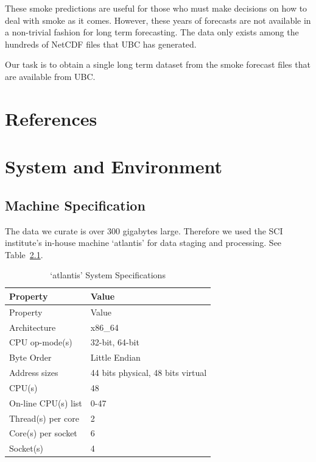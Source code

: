 \documentclass[
  letterpaper,
  DIV=11,
  numbers=noendperiod]{scrreprt}
\begin{document}
These smoke predictions are useful for those who must make decisions on
how to deal with smoke as it comes. However, these years of forecasts
are not available in a non-trivial fashion for long term forecasting.
The data only exists among the hundreds of NetCDF files that UBC has
generated.

Our task is to obtain a single long term dataset from the smoke forecast
files that are available from UBC.


\chapter{References}\label{references}


\chapter{System and Environment}\label{sec-sys-specs}

\section{Machine Specification}\label{machine-specification}

The data we curate is over 300 gigabytes large. Therefore we used the
SCI institute's in-house machine `atlantis' for data staging and
processing. See Table~\ref{tbl-specs}.

\begin{longtable}[]{@{}ll@{}}
\caption{`atlantis' System
Specifications}\label{tbl-specs}\tabularnewline
\toprule\noalign{}
Property & Value \\
\midrule\noalign{}
\endfirsthead
\toprule\noalign{}
Property & Value \\
\midrule\noalign{}
\endhead
\bottomrule\noalign{}
\endlastfoot
Architecture & x86\_64 \\
CPU op-mode(s) & 32-bit, 64-bit \\
Byte Order & Little Endian \\
Address sizes & 44 bits physical, 48 bits virtual \\
CPU(s) & 48 \\
On-line CPU(s) list & 0-47 \\
Thread(s) per core & 2 \\
Core(s) per socket & 6 \\
Socket(s) & 4 \\
\end{longtable}
\end{document}
